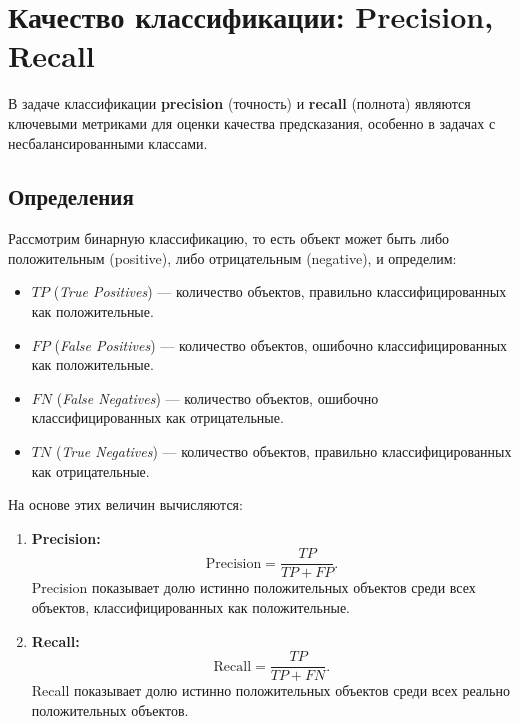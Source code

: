 \section*{Качество классификации: Precision, Recall}

В задаче классификации \textbf{precision} (точность) и \textbf{recall} (полнота) являются ключевыми метриками для оценки качества предсказания, особенно в задачах с несбалансированными классами.

\subsection*{Определения}

Рассмотрим бинарную классификацию, то есть объект может быть либо положительным (positive), либо отрицательным (negative), и определим:

\begin{itemize}
    \item $TP$ (\textit{True Positives}) — количество объектов, правильно классифицированных как положительные.
    \item $FP$ (\textit{False Positives}) — количество объектов, ошибочно классифицированных как положительные.
    \item $FN$ (\textit{False Negatives}) — количество объектов, ошибочно классифицированных как отрицательные.
    \item $TN$ (\textit{True Negatives}) — количество объектов, правильно классифицированных как отрицательные.
\end{itemize}

На основе этих величин вычисляются:

\begin{enumerate}
    \item \textbf{Precision:}
          \[
              \text{Precision} = \frac{TP}{TP + FP}.
          \]
          Precision показывает долю истинно положительных объектов среди всех объектов, классифицированных как положительные.

    \item \textbf{Recall:}
          \[
              \text{Recall} = \frac{TP}{TP + FN}.
          \]
          Recall показывает долю истинно положительных объектов среди всех реально положительных объектов.
\end{enumerate}

